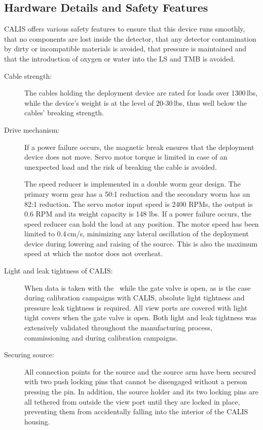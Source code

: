 \subsection{Hardware Details and Safety Features}\label{sec:HardwareDetails}\label{sec:SafetyFeatures}
CALIS offers various safety features to ensure that this device runs smoothly, that no components are lost inside the detector, that any detector contamination by dirty or incompatible materials is avoided, that pressure is maintained and that the introduction of oxygen or water into the LS and TMB is avoided. %

\begin{description}

\item[Cable strength:]
The cables holding the deployment device are rated for loads over 1300\,lbs, while the device's weight is at the level of 20-30\,lbs, thus well below the cables' breaking strength.

\item[Drive mechanism:]
If a power failure occurs, the magnetic break ensures that the deployment device does not move. Servo motor torque is limited in case of an unexpected load and the risk of breaking the cable is avoided.

The speed reducer is implemented in a double worm gear design. The primary worm gear has a 50:1 reduction and the secondary worm has an 82:1 reduction. The servo motor input speed is 2400 RPMs, the output is 0.6 RPM and its weight capacity is 148 lbs. If a power failure occurs, the speed reducer can hold the load at any position. The motor speed has been limited to 0.4\,cm/s, minimizing any lateral oscillation of the deployment device during lowering and raising of the source. This is also the maximum speed at which the motor does not overheat.

\item[Light and leak tightness of CALIS:]
When data is taken with the \lsv\ while the gate valve is open, as is the case during calibration campaigns with CALIS, absolute light tightness and pressure leak tightness is required. All view ports are covered with light tight covers when the gate valve is open. Both light and leak tightness was extensively validated throughout the manufacturing process, commissioning and during calibration campaigns.

\item[Securing source:] 
All connection points for the source and the source arm have been secured with two push locking pins that cannot be disengaged without a person pressing the pin. In addition, the source holder and its two locking pins are all tethered from outside the view port until they are locked in place, preventing them from accidentally falling into the interior of the CALIS housing.


\end{description}
